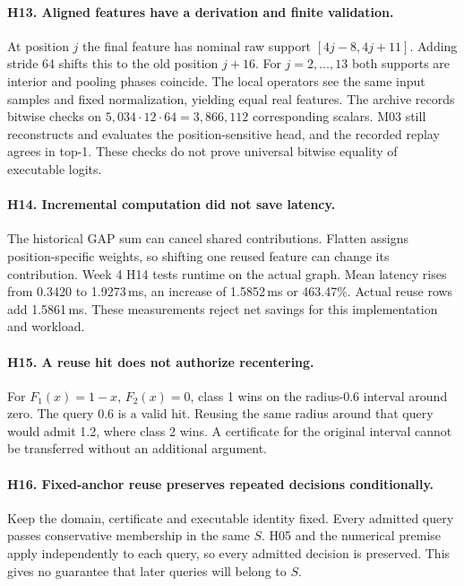 \paragraph{H13. Aligned features have a derivation and finite validation.}
At position $j$ the final feature has nominal raw support $[4j-8,4j+11]$. Adding stride 64 shifts this to the old position $j+16$. For $j=2,\ldots,13$ both supports are interior and pooling phases coincide. The local operators see the same input samples and fixed normalization, yielding equal real features. The archive records bitwise checks on $5{,}034\cdot12\cdot64=3{,}866{,}112$ corresponding scalars. M03 still reconstructs and evaluates the position-sensitive head, and the recorded replay agrees in top-1. These checks do not prove universal bitwise equality of executable logits.

\paragraph{H14. Incremental computation did not save latency.}
The historical GAP sum can cancel shared contributions. Flatten assigns position-specific weights, so shifting one reused feature can change its contribution. Week 4 H14 tests runtime on the actual graph. Mean latency rises from 0.3420 to 1.9273\,ms, an increase of 1.5852\,ms or 463.47\%. Actual reuse rows add 1.5861\,ms. These measurements reject net savings for this implementation and workload.

\paragraph{H15. A reuse hit does not authorize recentering.}
For $F_1(x)=1-x$, $F_2(x)=0$, class 1 wins on the radius-0.6 interval around zero. The query 0.6 is a valid hit. Reusing the same radius around that query would admit 1.2, where class 2 wins. A certificate for the original interval cannot be transferred without an additional argument.

\paragraph{H16. Fixed-anchor reuse preserves repeated decisions conditionally.}
Keep the domain, certificate and executable identity fixed. Every admitted query passes conservative membership in the same $S$. H05 and the numerical premise apply independently to each query, so every admitted decision is preserved. This gives no guarantee that later queries will belong to $S$.

